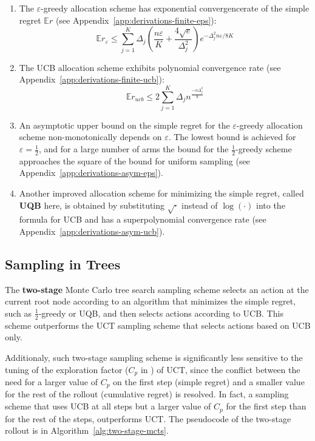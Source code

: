 \documentclass{article}
\newcommand {\IE} {\ensuremath {\mathbb{E}}}
\begin{document}
\begin{enumerate}
\item The $\varepsilon$-greedy allocation scheme has exponential convergencerate of the simple regret $\IE r$ (see Appendix~\ref{app:derivations-finite-eps}):
\begin{equation}
  \IE r_\varepsilon\le\sum_{j=1}^K\Delta_j\left(\frac {n\varepsilon} K + \frac {4\sqrt e}
{\Delta_j^2}\right)e^{-\Delta_j^2n\varepsilon/8K}
\end{equation}
\item The UCB allocation scheme exhibits polynomial convergence
rate (see Appendix~\ref{app:derivations-finite-ucb}):
\begin{equation}
\IE r_{ucb} \le 2\sum_{j=1}^K \Delta_jn^{\frac {-\alpha \Delta_j^2} 8}
\end{equation}
\item An asymptotic upper bound on the simple regret for the
$\varepsilon$-greedy allocation scheme non-monotonically depends on
$\varepsilon$. The lowest bound is achieved for $\varepsilon=\frac 1
2$, and for a large number of arms the bound for the $\frac 1
2$-greedy scheme approaches the square of the bound for uniform
sampling (see Appendix~\ref{app:derivations-asym-eps}).

\item Another improved allocation scheme for minimizing the simple regret,
called \textbf{UQB} here, is obtained by substituting $\sqrt{\cdot}$
instead of $\log(\cdot)$ into the formula for UCB and has a
superpolynomial convergence rate (see
Appendix~\ref{app:derivations-asym-ucb}).
\end{enumerate}

\subsection{Sampling in Trees}
\label{sec:sampling-in-trees}

The {\bf two-stage} Monte Carlo tree search sampling
scheme selects an action at the current root node according to an
algorithm that minimizes the simple regret, such as $\frac 1 2$-greedy or
UQB, and then selects actions according to UCB. This scheme
outperforms the UCT sampling scheme that selects actions based on
UCB only.

Additionaly, such two-stage sampling scheme is significantly less
sensitive to the tuning of the exploration factor ($C_p$ in
\cite{Kocsis.uct}) of UCT, since the conflict \cite{Bubeck.pure}
between the need for a larger value of $C_p$ on the first step (simple
regret) and a smaller value for the rest of the rollout (cumulative
regret) is resolved. In fact, a sampling scheme that uses UCB at all
steps but a larger value of $C_p$ for the first step than for the rest
of the steps, outperforms UCT. The pseudocode of the two-stage rollout
is in Algorithm~\ref{alg:two-stage-mcts}.
\end{document}
